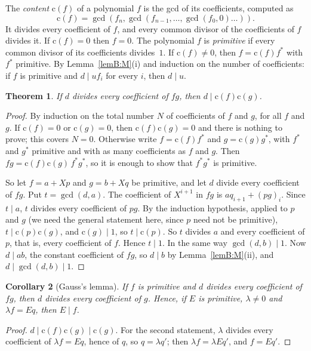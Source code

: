 \documentclass[11pt]{amsart}
\newtheorem{theorem}{Theorem}[section]
\newtheorem{corollary}[theorem]{Corollary}
\theoremstyle{definition}
\theoremstyle{remark}
\newcommand{\cont}{\mathrm{c}}
\newcommand{\gcdd}{\operatorname{gcd}}
\begin{document}
The \emph{content} $\cont(f)$ of a polynomial $f$ is the gcd of its
coefficients, computed as
\[\cont(f) = \gcdd(f_n,\gcdd(f_{n-1},\dots,\gcdd(f_0,0)\dots)).\]
It divides every
coefficient of $f$, and every common divisor of the coefficients of $f$
divides it. If $\cont(f) = 0$ then $f = 0$. The polynomial $f$ is
\emph{primitive} if every common divisor of its coefficients divides~$1$.
If $\cont(f)\neq0$, then $f = \cont(f)f^*$ with $f^*$ primitive. By
Lemma~\ref{lemB:M}(i) and induction on the number of coefficients: if
$f$ is primitive and $d\mid uf_i$ for every $i$, then $d\mid u$.

\begin{theorem}\label{thmB:C}
If $d$ divides every coefficient of $fg$, then $d\mid\cont(f)\cont(g)$.
\end{theorem}
\begin{proof}
By induction on the total number $N$ of coefficients of $f$ and $g$, for
all $f$ and $g$. If $\cont(f) = 0$ or $\cont(g) = 0$, then
$\cont(f)\cont(g) = 0$ and there is nothing to prove; this covers $N=0$.
Otherwise write $f = \cont(f)f^*$ and $g = \cont(g)g^*$, with $f^*$ and
$g^*$ primitive and with as many coefficients as $f$ and $g$. Then
$fg = \cont(f)\cont(g)\,f^*g^*$, so it is enough to show that $f^*g^*$
is primitive.

So let $f = a + Xp$ and $g = b + Xq$ be primitive, and let $d$ divide
every coefficient of $fg$. Put $t = \gcdd(d,a)$. The coefficient of
$X^{i+1}$ in $fg$ is $aq_{i+1}+(pg)_i$. Since $t\mid a$, $t$ divides
every coefficient of $pg$. By the induction hypothesis, applied to $p$
and $g$ (we need the general statement here, since $p$ need not be
primitive), $t\mid\cont(p)\cont(g)$, and $\cont(g)\mid1$, so
$t\mid\cont(p)$. So $t$ divides $a$ and every coefficient of $p$, that
is, every coefficient of $f$. Hence $t\mid1$. In the same way
$\gcdd(d,b)\mid1$. Now $d\mid ab$, the constant coefficient of $fg$, so
$d\mid b$ by Lemma~\ref{lemB:M}(ii), and $d\mid\gcdd(d,b)\mid1$.
\end{proof}

\begin{corollary}[Gauss's lemma]\label{corB:gauss}
If $f$ is primitive and $d$ divides every coefficient of $fg$, then $d$
divides every coefficient of $g$. Hence, if $E$ is primitive,
$\lambda\neq0$ and $\lambda f = Eq$, then $E\mid f$.
\end{corollary}
\begin{proof}
$d\mid\cont(f)\cont(g)\mid\cont(g)$. For the second statement, $\lambda$
divides every coefficient of $\lambda f = Eq$, hence of $q$, so
$q = \lambda q'$; then $\lambda f = \lambda Eq'$, and $f = Eq'$.
\end{proof}
\end{document}
